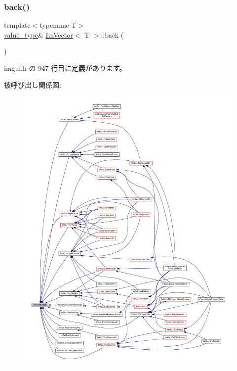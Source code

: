 \subsubsection{\texorpdfstring{back()}{back()}\hspace{0.1cm}{\footnotesize\ttfamily [1/2]}}
{\footnotesize\ttfamily template$<$typename T$>$ \\
\mbox{\hyperlink{class_im_vector_a8bd77e4e7581d8e5f9e98d7c2f3c2a80}{value\+\_\+type}}\& \mbox{\hyperlink{class_im_vector}{Im\+Vector}}$<$ T $>$\+::back (\begin{DoxyParamCaption}{ }\end{DoxyParamCaption})\hspace{0.3cm}{\ttfamily [inline]}}



 imgui.\+h の 947 行目に定義があります。

被呼び出し関係図\+:\nopagebreak
\begin{figure}[H]
\begin{center}
\leavevmode
\includegraphics[width=350pt]{class_im_vector_a3e4424d3fca190894598a6575f9d2401_icgraph}
\end{center}
\end{figure}
\mbox{\label{class_im_vector_a6f22918d4f139a1c4c3410ccae726f81}} 

